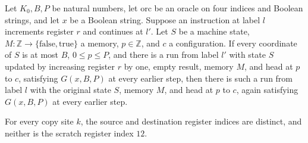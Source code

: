 \begin{lemma}
\label{Complexity.LogProg.ExpBFS.inc_step}
\leanok
{}
Let $K_0,B,P$ be natural numbers, let $\mathrm{orc}$ be an oracle on four indices and
Boolean strings, and let $x$ be a Boolean string. Suppose an instruction at label $l$
increments register $r$ and continues at $l'$. Let $S$ be a machine state, $M:\mathbb
Z\to\{\mathrm{false},\mathrm{true}\}$ a memory, $p\in\mathbb Z$, and $c$ a
configuration. If every coordinate of $S$ is at most $B$, $0\le p\le P$, and there is a
run from label $l'$ with state $S$ updated by increasing register $r$ by one, empty
result, memory $M$, and head at $p$ to $c$, satisfying $G(x,B,P)$ at every earlier step,
then there is such a run from label $l$ with the original state $S$, memory $M$, and
head at $p$ to $c$, again satisfying $G(x,B,P)$ at every earlier step.
\end{lemma}

\begin{lemma}
\label{Complexity.LogProg.ExpBFS.cp_ne}
\leanok
{}
For every copy site $k$, the source and destination register indices are distinct, and
neither is the scratch register index $12$.
\end{lemma}

